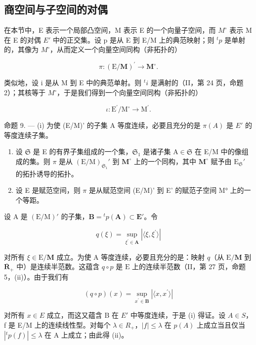 \subsection{商空间与子空间的对偶}

在本节中，E 表示一个局部凸空间，M 表示 E 的一个向量子空间，而 \(M^{\circ}\) 表示 M 在 E 的对偶 \(E'\) 中的正交集。设 p 是从 E 到 E/M 上的典范映射；则 \(^{t}p\) 是单射的，其像为 \(M^{\circ}\)，从而定义一个向量空间同构（非拓扑的）

\[
\pi : (\mathrm{E} / \mathbf {M}) ^ {\prime} \rightarrow \mathbf {M} ^ {\circ}.
\]

类似地，设 i 是从 M 到 E 中的典范单射。则 \({}^{t}i\) 是满射的（II，第 24 页，命题 2）；其核等于 \(M^{\circ}\)，于是我们得到一个向量空间同构（非拓扑的）

\[
\iota : \mathrm{E} ^ {\prime} / \mathrm{M} ^ {\circ} \rightarrow \mathrm{M} ^ {\prime}.
\]

命题 9. --- (i) 为使 (E/M)' 的子集 A 等度连续，必要且充分的是 \(\pi(A)\) 是 \(E'\) 的等度连续子集。

\begin{enumerate}
\def\labelenumi{(\roman{enumi})}
\setcounter{enumi}{1}
\item
  设 \(\mathfrak{S}\) 是 E 的有界子集组成的一个集，\(\mathfrak{S}_1\) 是诸子集 \(\mathrm{A} \in \mathfrak{S}\) 在 E/M 中的像组成的集。则 \(\pi\) 是从 \((\mathrm{E} / \mathrm{M})_{\mathfrak{S}_1}'\) 到 \(\mathbf{M}^\circ\) 上的一个同构，其中 \(\mathbf{M}^\circ\) 赋予由 \(\mathrm{E}_{\mathfrak{S}}'\) 的拓扑诱导的拓扑。
\item
  设 E 是赋范空间，则 \(\pi\) 是从赋范空间 (E/M)' 到 E' 的赋范子空间 M° 上的一个等距。
\end{enumerate}

设 A 是 \((\mathrm{E}/\mathrm{M})'\) 的子集，\(\mathbf{B} = {}^{t}p(\mathbf{A}) \subset \mathbf{E}'\)。令

\[
q (\xi) = \sup _ {\xi^ {\prime} \in \mathbf {A}} | \langle \xi , \xi^ {\prime} \rangle |
\]

对所有 \(\xi \in \mathrm{E} / \mathbf{M}\) 成立。为使 A 等度连续，必要且充分的是：映射 \(q\)（从 \(\mathrm{E} / \mathbf{M}\) 到 \(\overline{\mathbf{R}}_+\) 中）是连续半范数。这蕴含 \(q \circ p\) 是 \(\mathrm{E}\) 上的连续半范数（II，第 27 页，命题 5，(ii)）。由于我们有

\[
(q \circ p) (x) = \sup _ {x ^ {\prime} \in \mathbf {B}} | \langle x, x ^ {\prime} \rangle |
\]

对所有 \(x \in E\) 成立，而这又蕴含 B 在 \(E'\) 中等度连续，于是 (i) 得证。设 \(A \in S\)，f 是 E/M 上的连续线性型。对每个 \(\lambda \in R_{+}\)，\(|f| \leqslant \lambda\) 在 \(p(A)\) 上成立当且仅当 \(|^{t}p(f)| \leqslant \lambda\) 在 A 上成立；由此得 (ii)。

